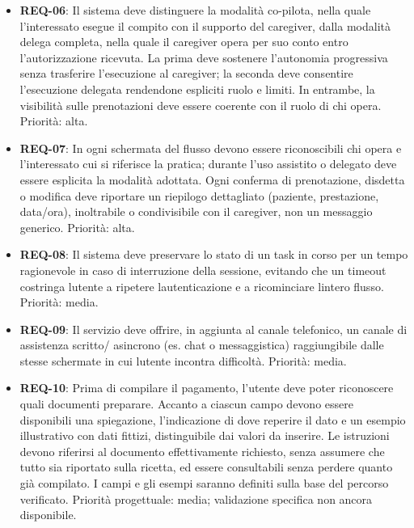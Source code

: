 \begin{itemize}
  dichiarazione di accessibilità già pubblicata dal cliente, prima del
  rilascio del prototipo finale. Priorità: media.
\item
  \hypertarget{req:REQ-06}{}\textbf{REQ-06}: Il sistema deve distinguere la modalità co-pilota,
  nella quale l'interessato esegue il compito con il supporto del caregiver,
  dalla modalità delega completa, nella quale il caregiver opera per suo
  conto entro l'autorizzazione ricevuta. La prima deve sostenere l'autonomia
  progressiva senza trasferire l'esecuzione al caregiver; la seconda deve
  consentire l'esecuzione delegata rendendone espliciti ruolo e limiti.
  In entrambe, la visibilità sulle prenotazioni deve essere coerente con
  il ruolo di chi opera. Priorità: alta.
\item
  \hypertarget{req:REQ-07}{}\textbf{REQ-07}: In ogni schermata del flusso devono essere riconoscibili
  chi opera e l'interessato cui si riferisce la pratica; durante l'uso
  assistito o delegato deve essere esplicita la modalità adottata.
  Ogni conferma di prenotazione, disdetta o modifica deve riportare un
  riepilogo dettagliato (paziente, prestazione, data/ora), inoltrabile o
  condivisibile con il caregiver, non un messaggio generico. Priorità: alta.
\item
  \hypertarget{req:REQ-08}{}\textbf{REQ-08}: Il sistema deve
  preservare lo stato di un task in corso per un tempo ragionevole in
  caso di interruzione della sessione, evitando che un timeout
  costringa l\textquotesingle utente a ripetere l\textquotesingle autenticazione
  e a ricominciare l\textquotesingle intero flusso. Priorità: media.
\item
  \hypertarget{req:REQ-09}{}\textbf{REQ-09}: Il servizio deve offrire,
  in aggiunta al canale telefonico, un canale di assistenza scritto/
  asincrono (es. chat o messaggistica) raggiungibile dalle stesse
  schermate in cui l\textquotesingle utente incontra difficoltà.
  Priorità: media.
\item
  \hypertarget{req:REQ-10}{}\textbf{REQ-10}: Prima di compilare il pagamento, l'utente deve poter
  riconoscere quali documenti preparare. Accanto a ciascun campo devono
  essere disponibili una spiegazione, l'indicazione di dove reperire il
  dato e un esempio illustrativo con dati fittizi, distinguibile dai valori
  da inserire. Le istruzioni devono riferirsi al documento effettivamente
  richiesto, senza assumere che tutto sia riportato sulla ricetta, ed
  essere consultabili senza perdere quanto già compilato. I campi e gli
  esempi saranno definiti sulla base del percorso verificato. Priorità
  progettuale: media; validazione specifica non ancora disponibile.
\end{itemize}
